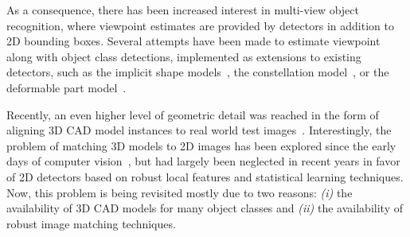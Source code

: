 As a consequence, there has been increased interest in multi-view object
recognition, where viewpoint estimates are provided by
detectors in addition to 2D bounding boxes. Several attempts have been
made to estimate viewpoint along with object class detections,
implemented as extensions to existing detectors, such as the implicit
shape models~\cite{}, the constellation model~\cite{}, or the
deformable part model~\cite{Xiang12,Pepik12,Fidler12,Hejrati14}.

Recently, an even higher level of geometric detail was reached in the
form of aligning
3D CAD model instances to real world test images~\cite{Aubry14,
  Lim14,Kholgade14, Chen13, Kostas14}. Interestingly, the problem of matching 3D models to 2D
images has been explored since the early days of computer
vision~\cite{Lowe87}, but had largely been neglected in recent years
in favor of 2D detectors based on robust local features and
statistical learning techniques. Now, this problem is being revisited
mostly due to two reasons: {\em (i)} the availability of 3D CAD models
for many object classes and {\em (ii)} the availability of robust
image matching techniques.
%
%
%
%

